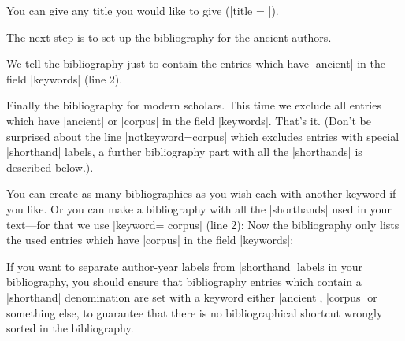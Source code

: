\documentclass[a4paper,
10pt,
greek,
french,
spanish,
italian,
ngerman,
english
]{ltxdoc}
\begin{document}
\begin{refsection}
    \nocite{*}
    \renewcommand\bibfont{\normalfont\footnotesize}
    \setlength{\labwidthsameline}{6em} 
\begin{example}
\printbibheading[%
  heading=bibliography,%
  title={Bibliography}] %
\end{example}
You can give any title you would like to give (|title = |).

The next step is to set up the bibliography for the ancient authors.

\setlength{\labwidthsameline}{6.5em} 
\begin{example}
\printbibliography[%
  keyword=ancient,%
  heading=subbibliography,
  title={Ancient authors and works}]
\end{example}
We tell the bibliography just to contain the entries which have |ancient| in the field |keywords| (line 2).


Finally the bibliography for modern scholars.
This time we exclude all entries which have |ancient| or |corpus| in the field |keywords|. 
That’s it.
(Don't be surprised about the line |notkeyword=corpus| which excludes entries with special |shorthand| labels, a further bibliography part with all the |shorthands| is described below.).

\setlength{\labwidthsameline}{7em} 
\begin{example}
\printbibliography[%
  notkeyword=ancient,%
  notkeyword=corpus,%
  heading=subbibliography,
  title={Secondary literature}]
\end{example}



You can create as many bibliographies as you wish each with another keyword if you like.
Or you can make a bibliography with all the |shorthands| used in your text---for that we use |keyword= {corpus}| (line 2):
Now the bibliography only lists the used entries which have |corpus| in the field |keywords|:
\begin{example}
\printbibliography[%
keyword={corpus},
heading=subbibliography,
title={Abbreviation of corpora}]
\label{bib:corpus}
\end{example}

\begin{marker}
 If you want to separate author-year labels from |shorthand| labels in your bibliography,  
 you should ensure that bibliography entries which contain a |shorthand| denomination 
are set with a keyword either |ancient|, |corpus| or something else, to guarantee that there is 
no bibliographical shortcut wrongly sorted in the bibliography.
\end{marker}



\end{refsection}
\end{document}
